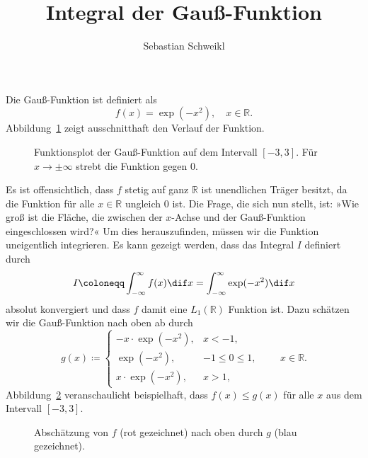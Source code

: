 \documentclass{scrartcl}
\newcommand{\R}{\mathbb{R}}
\begin{document}
\title{Integral der Gauß-Funktion}
\author{Sebastian Schweikl}


Die Gauß-Funktion ist definiert als
\[
  f(x) = \exp(-x^{2}), \quad x \in \mathbb{R}.
\]
Abbildung~\ref{fig:gaussian} zeigt ausschnitthaft den Verlauf der Funktion.
\begin{figure}[ht]
  \centering
  \caption{Funktionsplot der Gauß-Funktion auf dem Intervall $ [-3, 3] $. 
    Für $ x \rightarrow \pm \infty $ strebt die Funktion gegen $ 0 $.}
  \label{fig:gaussian}
\end{figure}
Es ist offensichtlich, dass $ f $ stetig auf ganz $ \R $ ist unendlichen Träger besitzt, da die 
Funktion für alle $ x \in \R $ ungleich $ 0 $ ist. Die Frage, die sich nun stellt, ist: »Wie groß 
ist die Fläche, die zwischen der $ x $-Achse und der Gauß-Funktion eingeschlossen wird?« Um dies 
herauszufinden, müssen wir die Funktion uneigentlich integrieren. Es kann gezeigt werden, dass das 
Integral $ I $ definiert durch
\[
  I \coloneqq \int_{- \infty}^{\infty} f(x) \dif x = \int_{- \infty}^{\infty} \exp(-x^{2}) \dif x
\]
absolut konvergiert und dass $ f $ damit eine $ L_{1}(\R) $ Funktion ist. Dazu schätzen wir die 
Gauß-Funktion nach oben ab durch
\[
  g(x) \coloneqq \begin{cases}
    -x \cdot \exp(-x^{2}), & x < -1, \\
    \exp(-x^{2}),          & -1 \leq 0 \leq 1, \\
    x \cdot \exp(-x^{2}),  & x > 1,
  \end{cases}
  \qquad x \in \R.
\]
Abbildung~\ref{fig:approximation} veranschaulicht beispielhaft, dass $ f(x) \leq g(x) $ für alle
$ x $ aus dem Intervall $ [-3,3] $.
\begin{figure}[ht]
  \centering
  \caption{Abschätzung von $ f $ (rot gezeichnet) nach oben durch $ g $ (blau gezeichnet).}
  \label{fig:approximation}
\end{figure}
\end{document}
